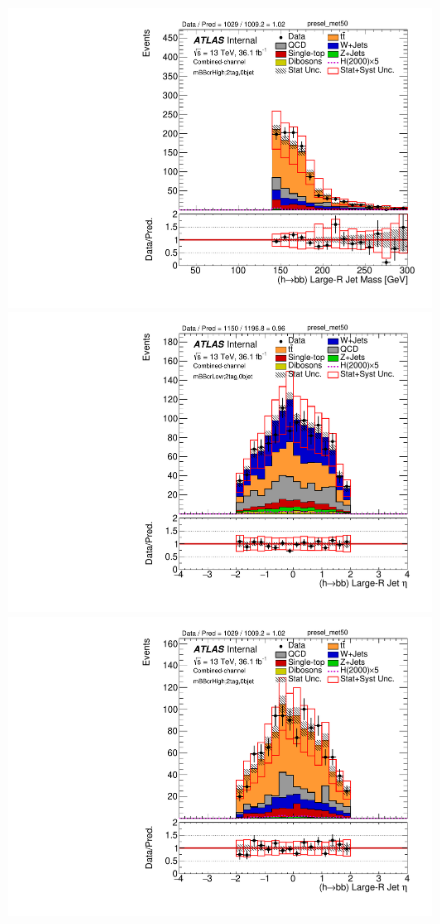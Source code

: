 \begin{figure}[!h]
\begin{center}
\includegraphics[scale=0.33]{./figures/boosted/PlotByMbbRegions/DataMC_2tag_0bjet_mbbcrHigh_lepton_presel_met50_HbbMass}                                                                            
\includegraphics[scale=0.33]{./figures/boosted/PlotByMbbRegions/DataMC_2tag_0bjet_mbbcrLow_lepton_presel_met50_HbbEta}
\includegraphics[scale=0.33]{./figures/boosted/PlotByMbbRegions/DataMC_2tag_0bjet_mbbcrHigh_lepton_presel_met50_HbbEta}                                                                             

\end{center}
\end{figure}
